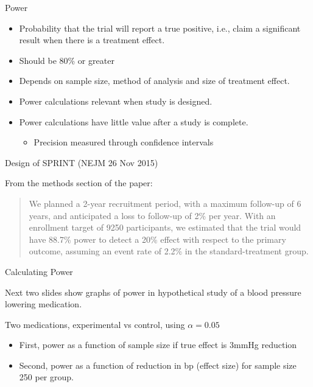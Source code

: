 \documentclass[ignorenonframetext,]{beamer}
\providecommand{\tightlist}{%
  \setlength{\itemsep}{0pt}\setlength{\parskip}{0pt}}
\begin{document}
\begin{frame}{%
\protect\hypertarget{power}{%
Power}}

\begin{itemize}
\item
  Probability that the trial will report a true positive, i.e., claim a
  significant result when there is a treatment effect.
\item
  Should be 80\% or greater
\item
  Depends on sample size, method of analysis and size of treatment
  effect.
\item
  Power calculations relevant when study is designed.
\item
  Power calculations have little value after a study is complete.

  \begin{itemize}
  \tightlist
  \item
    Precision measured through confidence intervals
  \end{itemize}
\end{itemize}

\end{frame}

\begin{frame}{%
\protect\hypertarget{design-of-sprint-nejm-26-nov-2015}{%
Design of SPRINT (NEJM 26 Nov 2015)}}

From the methods section of the paper:

\begin{quote}
We planned a 2-year recruitment period, with a maximum follow-up of 6 years, and anticipated a loss to follow-up of 2\% per year. With an enrollment target of 9250 participants, we estimated  that the trial would have 88.7\% power to detect  a 20\% effect with respect to the primary outcome, assuming an event rate of 2.2\% in the standard-treatment group.
\end{quote}

\end{frame}

\begin{frame}{%
\protect\hypertarget{calculating-power}{%
Calculating Power}}

Next two slides show graphs of power in hypothetical study of a blood
pressure lowering medication. \medskip

Two medications, experimental vs control, using \(\alpha = 0.05\)

\begin{itemize}
\item
  First, power as a function of sample size if true effect is 3mmHg
  reduction
\item
  Second, power as a function of reduction in bp (effect size) for
  sample size 250 per group.
\end{itemize}

\end{frame}
\end{document}
